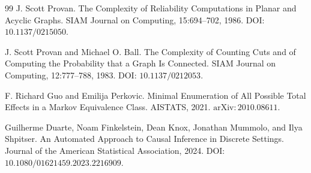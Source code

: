 \documentclass{article}
\begin{document}
\begin{thebibliography}{99}
   J. Scott Provan. The Complexity of Reliability Computations in Planar and Acyclic Graphs. SIAM Journal on Computing, 15:694--702, 1986. DOI: \(10.1137/0215050\).

   J. Scott Provan and Michael O. Ball. The Complexity of Counting Cuts and of Computing the Probability that a Graph Is Connected. SIAM Journal on Computing, 12:777--788, 1983. DOI: \(10.1137/0212053\).

   F. Richard Guo and Emilija Perkovic. Minimal Enumeration of All Possible Total Effects in a Markov Equivalence Class. AISTATS, 2021. \(\mathrm{arXiv}:2010.08611\).

   Guilherme Duarte, Noam Finkelstein, Dean Knox, Jonathan Mummolo, and Ilya Shpitser. An Automated Approach to Causal Inference in Discrete Settings. Journal of the American Statistical Association, 2024. DOI: \(10.1080/01621459.2023.2216909\).

\end{thebibliography}
\end{document}
